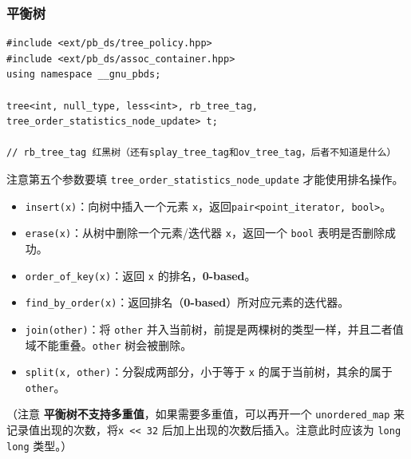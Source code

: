 \subsubsection{平衡树}

\begin{verbatim}
#include <ext/pb_ds/tree_policy.hpp>
#include <ext/pb_ds/assoc_container.hpp>
using namespace __gnu_pbds;

tree<int, null_type, less<int>, rb_tree_tag, tree_order_statistics_node_update> t;

// rb_tree_tag 红黑树（还有splay_tree_tag和ov_tree_tag，后者不知道是什么）
\end{verbatim}

注意第五个参数要填 \texttt{tree_order_statistics_node_update} 才能使用排名操作。

\begin{itemize}
	\item \texttt{insert(x)}：向树中插入一个元素 \texttt{x}，返回\texttt{pair<point_iterator, bool>}。
	\item \texttt{erase(x)}：从树中删除一个元素/迭代器 \texttt{x}，返回一个 \texttt{bool} 表明是否删除成功。
	\item \texttt{order_of_key(x)}：返回 \texttt{x} 的排名，\textbf{0-based}。
	\item \texttt{find_by_order(x)}：返回排名（\textbf{0-based}）所对应元素的迭代器。
	\item \texttt{join(other)}：将 \texttt{other} 并入当前树，前提是两棵树的类型一样，并且二者值域不能重叠。\texttt{other} 树会被删除。
	\item \texttt{split(x, other)}：分裂成两部分，小于等于 \texttt{x} 的属于当前树，其余的属于 \texttt{other}。
\end{itemize}

（注意 \textbf{平衡树不支持多重值}，如果需要多重值，可以再开一个 \texttt{unordered_map} 来记录值出现的次数，将\texttt{x << 32} 后加上出现的次数后插入。注意此时应该为 \texttt{long long} 类型。）
